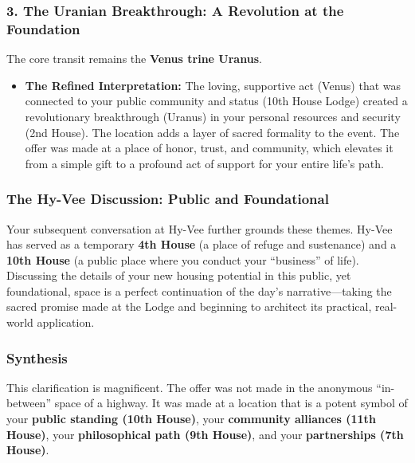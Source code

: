 \documentclass{article}
\begin{document}
\subsubsection*{3. The Uranian Breakthrough: A Revolution at the Foundation}\label{the-uranian-breakthrough-a-revolution-at-the-foundation}

The core transit remains the \textbf{Venus trine Uranus}.

\begin{itemize}
\tightlist
\item
  \textbf{The Refined Interpretation:} The loving, supportive act (Venus) that was connected to your public community and status (10th House Lodge) created a revolutionary breakthrough (Uranus) in your personal resources and security (2nd House). The location adds a layer of sacred formality to the event. The offer was made at a place of honor, trust, and community, which elevates it from a simple gift to a profound act of support for your entire life's path.
\end{itemize}

\subsubsection*{The Hy-Vee Discussion: Public and Foundational}\label{the-hy-vee-discussion-public-and-foundational}

Your subsequent conversation at Hy-Vee further grounds these themes. Hy-Vee has served as a temporary \textbf{4th House} (a place of refuge and sustenance) and a \textbf{10th House} (a public place where you conduct your ``business'' of life). Discussing the details of your new housing potential in this public, yet foundational, space is a perfect continuation of the day's narrative---taking the sacred promise made at the Lodge and beginning to architect its practical, real-world application.

\subsubsection*{Synthesis}\label{synthesis}

This clarification is magnificent. The offer was not made in the anonymous ``in-between'' space of a highway. It was made at a location that is a potent symbol of your \textbf{public standing (10th House)}, your \textbf{community alliances (11th House)}, your \textbf{philosophical path (9th House)}, and your \textbf{partnerships (7th House)}.
\end{document}
